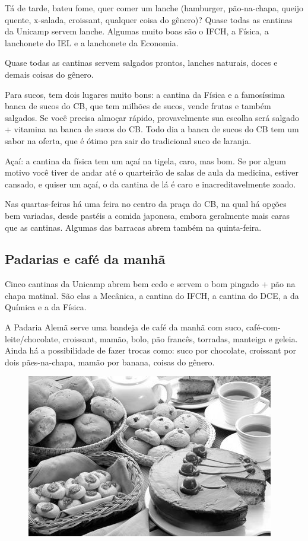 Tá de tarde, bateu fome, quer comer um lanche (hamburger, pão-na-chapa, queijo
quente, x-salada, croissant, qualquer coisa do gênero)? Quase todas as cantinas
da Unicamp servem lanche. Algumas muito boas são o IFCH, a Física, a lanchonete
do IEL e a lanchonete da Economia.

Quase todas as cantinas servem salgados prontos, lanches naturais, doces
e demais coisas do gênero.

Para sucos, tem dois lugares muito bons: a cantina da Física e a famosíssima
banca de sucos do CB, que tem milhões de sucos, vende frutas e também salgados.
Se você precisa almoçar rápido, provavelmente sua escolha será salgado
+ vitamina na banca de sucos do CB. Todo dia a banca de sucos do CB tem um sabor
na oferta, que é ótimo pra sair do tradicional suco de laranja.

Açaí: a cantina da física tem um açaí na tigela, caro, mas bom. Se por algum
motivo você tiver de andar até o quarteirão de salas de aula da medicina,
estiver cansado, e quiser um açaí, o da cantina de lá é caro
e inacreditavelmente zoado.

Nas quartas-feiras há uma feira no centro da praça do CB, na qual há opções bem
variadas, desde pastéis a comida japonesa, embora geralmente mais caras que as
cantinas. Algumas das barracas abrem também na quinta-feira.

\subsection{Padarias e café da manhã}

Cinco cantinas da Unicamp abrem bem cedo e servem o bom pingado + pão na chapa
matinal. São elas a Mecânica, a cantina do IFCH, a cantina do DCE, a da Química
e a da Física.

A Padaria Alemã serve uma bandeja de café da manhã com suco,
café-com-leite/chocolate, croissant, mamão, bolo, pão francês, torradas,
manteiga e geleia. Ainda há a possibilidade de fazer trocas como: suco por
chocolate, croissant por dois pães-na-chapa, mamão por banana, coisas do gênero.
\begin{figure}[h!]
    \centering
    \includegraphics[scale=0.68,keepaspectratio=true]{img/imgs/6-comida/padaria.jpg}
\end{figure}

